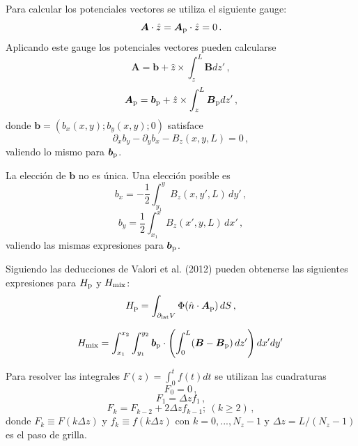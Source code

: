 \documentclass[a4paper,10pt]{article}
\def\bB{{\boldsymbol{B}}}
\def\bb{{\boldsymbol{b}}}
\def\bbp{{\boldsymbol{b}_{\rm p}}}
\def\bA{{\boldsymbol{A}}}
\def\bAp{\boldsymbol{A}_{\rm p}}
\def\bBp{\boldsymbol{B}_{\rm p}}
\begin{document}
Para calcular los potenciales vectores se utiliza el siguiente gauge:
\begin{equation}
 \bA \cdot \hat z = \bAp \cdot \hat z = 0 \,.
\end{equation}
Aplicando este gauge los potenciales vectores pueden calcularse 
\begin{equation}
 \bA = \bb +  \hat z \times \int_z^L \bB dz' \,,
 \label{potA}
\end{equation}
\begin{equation}
 \bAp = \bbp +  \hat z \times \int_z^L \bBp dz' \,,
 \label{potAp}
\end{equation}
donde $\bb = (b_x(x,y); b_y(x,y);0)$  satisface
\begin{equation}
 \partial_x{b_y}-\partial_y{b_x}-B_z(x,y,L)=0 \,,
\end{equation}
valiendo lo mismo para $\bbp$.

La elección de $\bb$ no es única. Una elección posible es
\begin{equation}
 b_x = -\frac{1}{2} \int_{y_1}^y B_z (x,y',L)\, dy' \,,
\end{equation}
\begin{equation}
 b_y = \frac{1}{2} \int_{x_1}^x B_z (x',y,L)\, dx' \,,
\end{equation}
valiendo las mismas expresiones para $\bbp$. 

Siguiendo las deducciones de Valori et al. (2012) pueden obtenerse las siguientes expresiones para $H_{\rm p}$ y $H_{\rm mix}$:
\begin{equation}
 H_{\rm p} = \int_{\partial_{\rm lat}V} \Phi (\hat n \cdot \bAp) \, dS \,,
\end{equation}

\begin{equation}
H_{\rm mix} = \int_{x_1}^{x_2} \int_{y_1}^{y_2} \bbp \cdot \left( \int_0^L(\bB - \bBp)\,dz' \right)dx'dy' \,
\end{equation}

Para resolver las integrales $F(z)=\int_0^t f(t) dt$ se utilizan las cuadraturas
\begin{equation}
 F_0=0 \,,
 \end{equation}
\begin{equation}
 F_1=\Delta z f_1 \,,
\end{equation}
\begin{equation}
 F_k = F_{k-2} + 2 \Delta z f_{k-1}; \ (k\ge 2) \,,
\end{equation}
donde $F_k \equiv F(k\Delta z)$ y $f_k \equiv f(k\Delta z)$ con $k=0,..., N_z-1$ y $\Delta z=L/(N_z-1)$ es el paso de grilla. 
\end{document}
